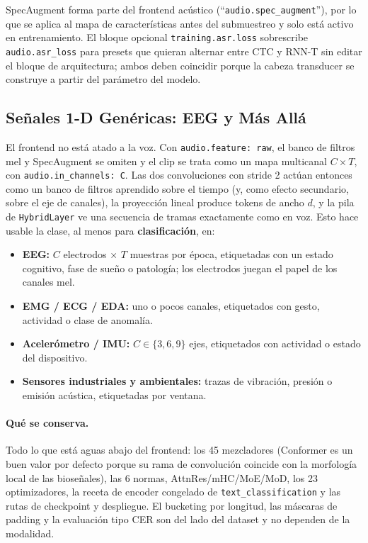 SpecAugment forma parte del frontend acústico (``\texttt{audio.spec\_augment}''), por lo que se aplica al mapa de características antes del submuestreo y solo está activo en entrenamiento. El bloque opcional \texttt{training.asr.loss} sobrescribe \texttt{audio.asr\_loss} para presets que quieran alternar entre CTC y RNN-T sin editar el bloque de arquitectura; ambos deben coincidir porque la cabeza transducer se construye a partir del parámetro del modelo.

\subsection{Señales 1-D Genéricas: EEG y Más Allá}
\label{sec:annex-18-eeg}

El frontend no está atado a la voz. Con \texttt{audio.feature: raw}, el banco de filtros mel y SpecAugment se omiten y el clip se trata como un mapa multicanal $C \times T$, con \texttt{audio.in\_channels: C}. Las dos convoluciones con stride 2 actúan entonces como un banco de filtros aprendido sobre el tiempo (y, como efecto secundario, sobre el eje de canales), la proyección lineal produce tokens de ancho $d$, y la pila de \texttt{HybridLayer} ve una secuencia de tramas exactamente como en voz. Esto hace usable la clase, al menos para \textbf{clasificación}, en:

\begin{itemize}[leftmargin=*]
    \item \textbf{EEG:} $C$ electrodos $\times$ $T$ muestras por época, etiquetadas con un estado cognitivo, fase de sueño o patología; los electrodos juegan el papel de los canales mel.
    \item \textbf{EMG / ECG / EDA:} uno o pocos canales, etiquetados con gesto, actividad o clase de anomalía.
    \item \textbf{Acelerómetro / IMU:} $C \in \{3, 6, 9\}$ ejes, etiquetados con actividad o estado del dispositivo.
    \item \textbf{Sensores industriales y ambientales:} trazas de vibración, presión o emisión acústica, etiquetadas por ventana.
\end{itemize}

\paragraph{Qué se conserva.} Todo lo que está aguas abajo del frontend: los 45 mezcladores (Conformer es un buen valor por defecto porque su rama de convolución coincide con la morfología local de las bioseñales), las 6 normas, AttnRes/mHC/MoE/MoD, los 23 optimizadores, la receta de encoder congelado de \texttt{text\_classification} y las rutas de checkpoint y despliegue. El bucketing por longitud, las máscaras de padding y la evaluación tipo CER son del lado del dataset y no dependen de la modalidad.

